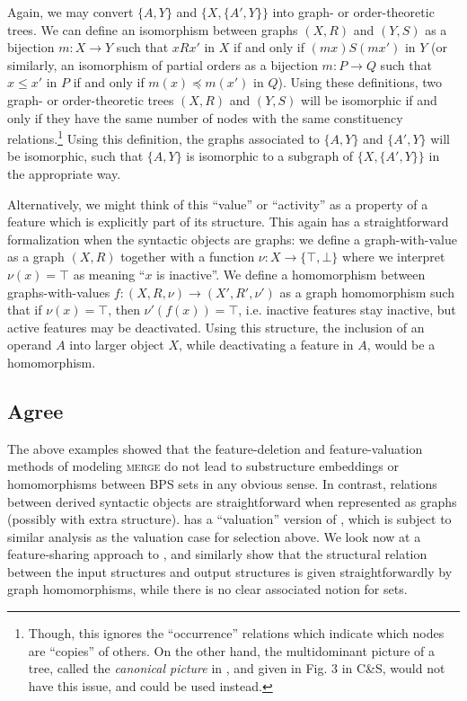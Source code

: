 \documentclass[output=paper]{langsci/langscibook}
\begin{document}
Again, we may convert $\{A,Y\}$ and $\{X,\{A',Y\}\}$ into graph- or
order-theoretic trees. We can define an isomorphism between graphs $(X,R)$ and
$(Y,S)$ as a bijection $m:X\rightarrow Y$ such that $xRx'$ in $X$ if and only
if $(mx) S (mx')$ in $Y$ (or similarly, an isomorphism of partial orders as a
bijection $m:P\rightarrow Q$ such that $x\leq x'$ in $P$ if and only if
$m(x)\preceq m(x')$ in $Q$). Using these definitions, two graph- or
order-theoretic trees $(X,R)$ and $(Y,S)$ will be isomorphic if and only if
they have the same number of nodes with the same constituency
relations.\footnote{Though, this ignores the \enquote{occurrence} relations which
    indicate which nodes are \enquote{copies} of others. On the other hand, the
multidominant picture of a tree, called the \emph{canonical picture} in
\cite{aczel}, and given in Fig. 3 in C\&S\nocite{ColSta2016}, would not have
this issue, and could be used instead.} Using this definition, the graphs
associated to $\{A,Y\}$ and $\{A',Y\}$ will be isomorphic, such that $\{A,Y\}$
is isomorphic to a subgraph of $\{X,\{A',Y\}\}$ in the appropriate way.

Alternatively, we might think of this \enquote{value} or \enquote{activity} as a property of a
feature which is explicitly part of its structure. This again has a
straightforward formalization when the syntactic objects are graphs: we define
a graph-with-value as a graph $(X,R)$ together with a function
$\nu:X\rightarrow\{\top,\bot\}$ where we interpret $\nu (x)=\top$ as meaning
``$x$ is inactive''. We define a homomorphism between graphs-with-values
$f:(X,R,\nu)\rightarrow (X',R',\nu')$ as a graph homomorphism such that if
$\nu(x)=\top$, then $\nu'(f(x))=\top$, i.e. inactive features stay inactive,
but active features may be deactivated. Using this structure, the inclusion of
an operand $A$ into larger object $X$, while deactivating a feature in $A$,
would be a homomorphism.

\subsection{Agree}

The above examples showed that the feature-deletion and feature-valuation
methods of modeling \textsc{merge} do not lead to substructure embeddings or
homomorphisms between \gls{BPS} sets in any obvious sense.  In contrast,
relations between derived syntactic objects are straightforward when
represented as graphs (possibly with extra structure).
\cite{chomsky1999derivation} has a \enquote{valuation} version of , which is
subject to similar analysis as the valuation case for selection above. We look
now at a feature-sharing approach to , and similarly show that the
structural relation between the input structures and output structures is given
straightforwardly by graph homomorphisms, while there is no clear associated
notion for sets.
\end{document}
